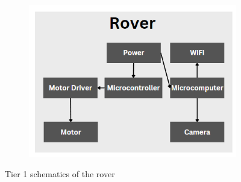 \documentclass[a4paper, 10pt]{article}
\begin{document}
		\begin{figure}[h]
			\begin{subfigure}[h]{0.55\textwidth}
				\centering
				\includegraphics[width=\textwidth]{Photos/Rover tier 1 schematic}
			\end{subfigure}
			\centering
			\caption{Tier 1 schematics of the rover}
			\label{tier_1_schems}
		\end{figure}
 
\end{document}
